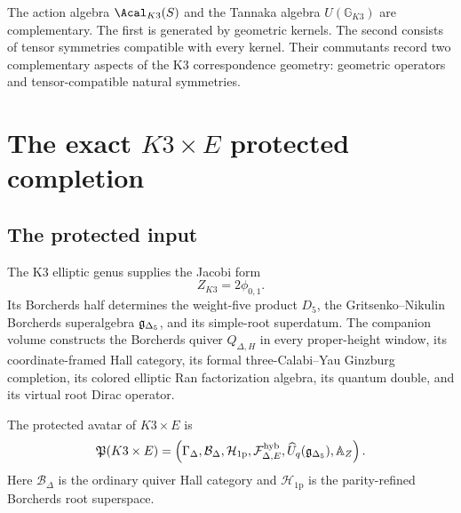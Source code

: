 The action algebra $\Acal_{K3}(S)$ and the Tannaka algebra $U(\mathbb G_{K3})$ are complementary.  The first is generated by geometric kernels.  The second consists of tensor symmetries compatible with every kernel.  Their commutants record two complementary aspects of the K3 correspondence geometry: geometric operators and tensor-compatible natural symmetries.

\part{The exact \texorpdfstring{$K3\times E$}{K3 x E} protected completion}

\chapter{The protected input}
The K3 elliptic genus supplies the Jacobi form
\[
 Z_{K3}=2\phi_{0,1}.
\]
Its Borcherds half determines the weight-five product $D_5$, the Gritsenko--Nikulin Borcherds superalgebra ${\mathfrak g_{\Delta_5}}$, and its simple-root superdatum.  The companion volume constructs the Borcherds quiver $Q_{\Delta,H}$ in every proper-height window, its coordinate-framed Hall category, its formal three-Calabi--Yau Ginzburg completion, its colored elliptic Ran factorization algebra, its quantum double, and its virtual root Dirac operator.

\begin{definition}
The protected avatar of $K3\times E$ is
\[
 \mathfrak P(K3\times E)=
 \left(
 \Gamma_\Delta,
 \mathcal B_\Delta,
 \mathcal H_{\mathrm{1p}},
 \mathcal F^{\mathrm{hyb}}_{\Delta,E},
 \widehat U_q({\mathfrak g_{\Delta_5}}),
 \mathbb A_Z
 \right).
\]
Here $\mathcal B_\Delta$ is the ordinary quiver Hall category and $\mathcal H_{\mathrm{1p}}$ is the parity-refined Borcherds root superspace.
\end{definition}

